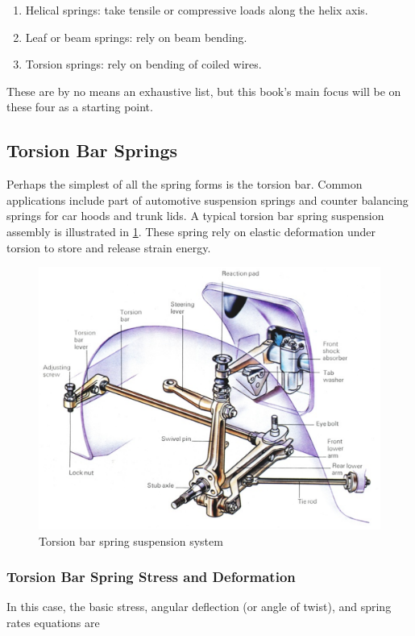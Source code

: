 \documentclass[a4paper,openany,nobib]{tufte-book}
\begin{document}
{{\begin{enumerate}
\item Helical springs: take tensile or compressive loads along the helix
axis.

\item Leaf or beam springs: rely on beam bending.

\item Torsion springs: rely on bending of coiled wires.
\end{enumerate}

These are by no means an exhaustive list, but this book's main focus
will be on these four as a starting point.

\subsection{Torsion Bar Springs}
\label{torsion-bar-springs}
Perhaps the simplest of all the spring forms is the torsion bar. Common
applications include part of automotive suspension springs and counter
balancing springs for car hoods and trunk lids. A typical torsion bar
spring suspension assembly is illustrated in
\ref{fig: torsion bar spring}. These spring
rely on elastic deformation under torsion to store and release strain
energy.


\begin{figure}[htbp]
\centering
\includegraphics[width=.9\linewidth]{pictures/Spring-design/torsion-bar-spring.pdf}
\caption{\label{fig: torsion bar spring}Torsion bar spring suspension system}
\end{figure}

\subsubsection{Torsion Bar Spring Stress and Deformation}
\label{torsion-bar-spring-stress-and-deformation}
In this case, the basic stress, angular deflection (or angle of twist),
and spring rates equations are

}}
\end{document}
